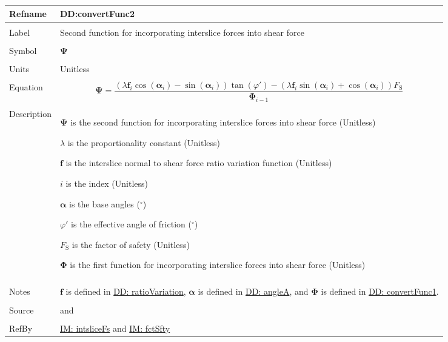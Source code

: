\documentclass[12pt]{article}
\begin{document}
\noindent \begin{minipage}{\textwidth}
\begin{tabular}{>{\raggedright}p{}>{\raggedright\arraybackslash}p{}}
\toprule \textbf{Refname} & \textbf{DD:convertFunc2}
\label{DD:convertFunc2}
\\ \midrule \\
Label & Second function for incorporating interslice forces into shear force
\\ \midrule \\
Symbol & $\mathbf{Ψ}$
\\ \midrule \\
Units & Unitless
\\ \midrule \\
Equation & \begin{displaymath}
           \mathbf{Ψ}=\frac{\left(λ {\mathbf{f}}_{i} \cos\left({\mathbf{α}}_{i}\right)-\sin\left({\mathbf{α}}_{i}\right)\right) \tan\left(φ'\right)-\left(λ {\mathbf{f}}_{i} \sin\left({\mathbf{α}}_{i}\right)+\cos\left({\mathbf{α}}_{i}\right)\right) {F_{\text{S}}}}{{\mathbf{Φ}}_{i-1}}
           \end{displaymath}
\\ \midrule \\
Description & \begin{symbDescription}
              \item{$\mathbf{Ψ}$ is the second function for incorporating interslice forces into shear force (Unitless)}
              \item{$λ$ is the proportionality constant (Unitless)}
              \item{$\mathbf{f}$ is the interslice normal to shear force ratio variation function (Unitless)}
              \item{$i$ is the index (Unitless)}
              \item{$\mathbf{α}$ is the base angles (${}^{\circ}$)}
              \item{$φ'$ is the effective angle of friction (${}^{\circ}$)}
              \item{${F_{\text{S}}}$ is the factor of safety (Unitless)}
              \item{$\mathbf{Φ}$ is the first function for incorporating interslice forces into shear force (Unitless)}
              \end{symbDescription}
\\ \midrule \\
Notes & $\mathbf{f}$ is defined in \hyperref[DD:ratioVariation]{DD: ratioVariation}, $\mathbf{α}$ is defined in \hyperref[DD:angleA]{DD: angleA}, and $\mathbf{Φ}$ is defined in \hyperref[DD:convertFunc1]{DD: convertFunc1}.
\\ \midrule \\
Source & \cite{chen2005} and \cite{karchewski2012}
\\ \midrule \\
RefBy & \hyperref[IM:intsliceFs]{IM: intsliceFs} and \hyperref[IM:fctSfty]{IM: fctSfty}
\\ \bottomrule
\end{tabular}
\end{minipage}
\par~
\end{document}
